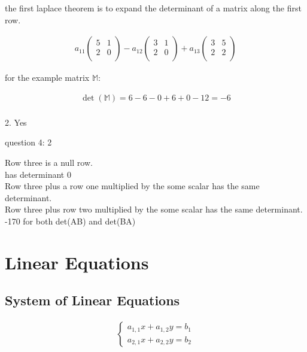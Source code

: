 \documentclass{article}
\begin{document}
the first laplace theorem is to expand the determinant of a matrix along the first row.

\begin{align}
    a_11 \begin{pmatrix}
             5 & 1 \\
             2 & 0 \\
         \end{pmatrix}
    - a_12 \begin{pmatrix}
               3 & 1 \\
               2 & 0 \\
           \end{pmatrix}
    + a_13 \begin{pmatrix}
               3 & 5 \\
               2 & 2 \\
           \end{pmatrix}
\end{align}

for the example matrix $\mathbb{M}$:

\begin{align}
    \det(\mathbb{M}) = 6 - 6 - 0 + 6 + 0 - 12 = -6 \\
\end{align}

2. Yes

question 4: 2

Row three is a null row. \\
has determinant 0 \\
Row three plus a row one multiplied by the some scalar has the same determinant. \\
Row three plus row two multiplied by the some scalar has the same determinant. \\
-170 \textrm{for both det(}AB\textrm{) and det(}BA\textrm{)}

\section{Linear Equations}

\subsection{System of Linear Equations}

\begin{align}
    \begin{cases}
        a_{1,1}x + a_{1,2}y = b_1 \\
        a_{2,1}x + a_{2,2}y = b_2
    \end{cases}
\end{align}
\end{document}
